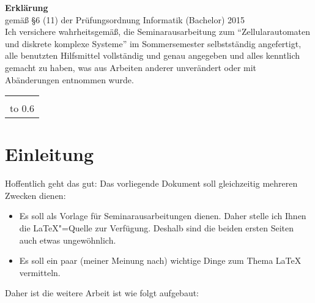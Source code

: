 {\thispagestyle{empty}\raggedright

\noindent \textbf{\Large Erklärung}\\[1ex]
gemäß \S 6 (11) der Prüfungsordnung Informatik %
(Bachelor) 2015 %
\\[\baselineskip]

\noindent
Ich versichere wahrheitsgemäß, die Seminarausarbeitung zum
\seminarart{} "`Zellularautomaten und diskrete komplexe Systeme"' im
Sommersemester \seminarjahr{} selbstständig angefertigt, alle
benutzten Hilfsmittel vollständig und genau angegeben und alles
kenntlich gemacht zu haben, was aus Arbeiten anderer unverändert oder
mit Abänderungen entnommen wurde.

\vspace*{30mm}
\noindent
\begin{tabular}{@{}l}
  \hline
   \\[-1ex]
  \hbox to 0.6\textwidth{(\teilnehmername, Matr.nr.~\teilnehmermatrnr) \hss}
\end{tabular}
}
\clearpage

\section{Einleitung}

Hoffentlich geht das gut: Das vorliegende Dokument soll gleichzeitig mehreren
Zwecken dienen:
%
\begin{itemize}[noitemsep]
\item Es soll als Vorlage für Seminarausarbeitungen dienen.
  Daher stelle ich Ihnen die \LaTeX"=Quelle zur Verfügung.
  Deshalb sind die beiden ersten Seiten auch etwas ungewöhnlich.
\item Es soll ein paar (meiner Meinung nach) wichtige Dinge zum Thema \LaTeX{}
  vermitteln.
\end{itemize}
%
Daher ist die weitere Arbeit ist wie folgt aufgebaut: 

